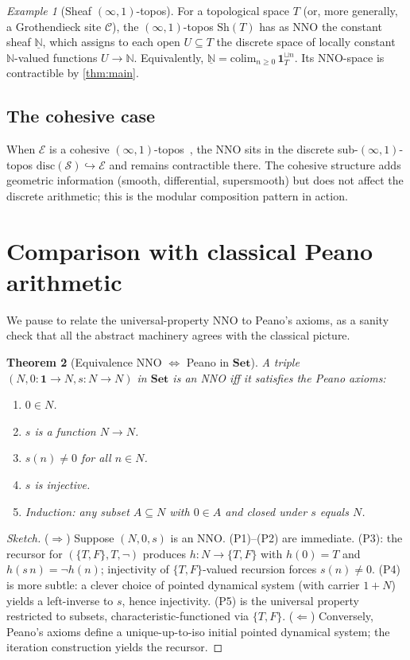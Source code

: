 \documentclass[12pt]{article}
\newtheorem{theorem}{Theorem}[section]
\theoremstyle{definition}
\theoremstyle{remark}
\newtheorem{example}[theorem]{Example}
\newcommand{\N}{\mathbb{N}}
\newcommand{\Set}{\mathbf{Set}}
\newcommand{\Spc}{\mathcal{S}}
\newcommand{\colim}{\mathrm{colim}}
\begin{document}
\begin{example}[Sheaf $(\infty,1)$-topos]
For a topological space $T$ (or, more generally, a Grothendieck site $\mathcal{C}$), the $(\infty,1)$-topos $\mathrm{Sh}(T)$ has as NNO the constant sheaf $\underline{\N}$, which assigns to each open $U\subseteq T$ the discrete space of locally constant $\N$-valued functions $U\to\N$. Equivalently, $\underline{\N}=\colim_{n\geq 0}\,\mathbf{1}_{T}^{\sqcup n}$. Its NNO-space is contractible by \cref{thm:main}.
\end{example}

\subsection{The cohesive case}

When $\mathcal{E}$ is a cohesive $(\infty,1)$-topos~\cite{SchreiberShulman}, the NNO sits in the discrete sub-$(\infty,1)$-topos $\mathrm{disc}(\Spc)\hookrightarrow\mathcal{E}$ and remains contractible there. The cohesive structure adds geometric information (smooth, differential, supersmooth) but does not affect the discrete arithmetic; this is the modular composition pattern in action.

\section{Comparison with classical Peano arithmetic}\label{sec:peano}

We pause to relate the universal-property NNO to Peano's axioms, as a sanity check that all the abstract machinery agrees with the classical picture.

\begin{theorem}[Equivalence NNO $\Leftrightarrow$ Peano in $\Set$]\label{thm:peano-equiv}
A triple $(N,0\colon\mathbf{1}\to N,s\colon N\to N)$ in $\Set$ is an NNO iff it satisfies the Peano axioms:
\begin{enumerate}[label=(P\arabic*)]
  \item $0\in N$.
  \item $s$ is a function $N\to N$.
  \item $s(n)\neq 0$ for all $n\in N$.
  \item $s$ is injective.
  \item Induction: any subset $A\subseteq N$ with $0\in A$ and closed under $s$ equals $N$.
\end{enumerate}
\end{theorem}

\begin{proof}[Sketch]
($\Rightarrow$) Suppose $(N,0,s)$ is an NNO\@. (P1)--(P2) are immediate. (P3): the recursor for $(\{T,F\},T,\neg)$ produces $h\colon N\to\{T,F\}$ with $h(0)=T$ and $h(s\,n)=\neg h(n)$; injectivity of $\{T,F\}$-valued recursion forces $s(n)\neq 0$. (P4) is more subtle: a clever choice of pointed dynamical system (with carrier $1+N$) yields a left-inverse to $s$, hence injectivity. (P5) is the universal property restricted to subsets, characteristic-functioned via $\{T,F\}$.
($\Leftarrow$) Conversely, Peano's axioms define a unique-up-to-iso initial pointed dynamical system; the iteration construction yields the recursor.
\end{proof}
\end{document}

